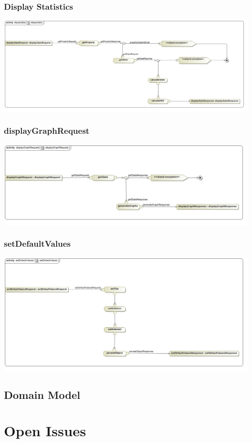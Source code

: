 \documentclass[a4paper,12pt]{article}
\begin{document}
\subsubsection{Display Statistics}
\includegraphics[width=1\textwidth]{./Images/processSpecification/displayStatsActivity.jpg}
\subsubsection{displayGraphRequest}
\includegraphics[width=1\textwidth]{./Images/processSpecification/displayGraphRequestActivity.jpg}
\subsubsection{setDefaultValues}
\includegraphics[width=1\textwidth]{./Images/processSpecification/setDefaultValuesActivity.jpg}

\subsection{Domain Model}

\newpage
\section{Open Issues}
\end{document}
